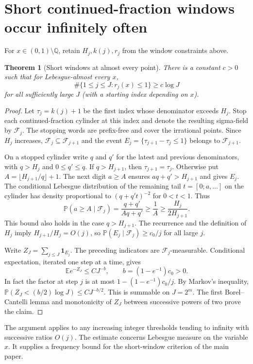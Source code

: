 \documentclass[11pt]{article}
\newtheorem{theorem}{Theorem}
\theoremstyle{definition}
\theoremstyle{remark}
\begin{document}
\section{Short continued-fraction windows occur infinitely often}
For $x\in(0,1)\setminus\mathbb Q$, retain $H_j,k(j),r_j$ from the window
constraints above.
\begin{theorem}[Short windows at almost every point]\label{thm:short-ae}
There is a constant $c>0$ such that for Lebesgue-almost every $x$,
\[
 \#\{1\le j\le J:r_j(x)\le1\}\ge c\log J
\]
for all sufficiently large $J$ (with a starting index depending on $x$).
\end{theorem}
\begin{proof}
Let $\tau_j=k(j)+1$ be the first index whose denominator exceeds $H_j$.
Stop each continued-fraction cylinder at this index and denote the
resulting sigma-field by $\mathcal F_j$. The stopping words are
prefix-free and cover the irrational points. Since $H_j$ increases,
$\mathcal F_j\subseteq\mathcal F_{j+1}$ and the event
$E_j=\{\tau_{j+1}-\tau_j\le1\}$ belongs to $\mathcal F_{j+1}$.

On a stopped cylinder write $q$ and $q'$ for the latest and previous
denominators, with $q>H_j$ and $0\le q'\le q$. If $q>H_{j+1}$, then
$\tau_{j+1}=\tau_j$. Otherwise put $A=\lfloor H_{j+1}/q\rfloor+1$.
The next digit $a\ge A$ ensures $a q+q'>H_{j+1}$ and gives $E_j$.
The conditional Lebesgue distribution of the remaining tail
$t=[0;a,\ldots]$ on the cylinder has density proportional to
$(q+q't)^{-2}$ for $0<t<1$. Thus
\[
 \mathbb P(a\ge A\mid\mathcal F_j)
 =\frac{q+q'}{Aq+q'}\ge\frac1A\ge \frac{H_j}{2H_{j+1}}.
\]
This bound also holds in the case $q>H_{j+1}$. The recurrence and the
definition of $H_j$ imply $H_{j+1}/H_j=O(j)$, so
$\mathbb P(E_j\mid\mathcal F_j)\ge c_0/j$ for all large $j$.

Write $Z_J=\sum_{j\le J}\mathbf 1_{E_j}$. The preceding indicators are
$\mathcal F_j$-measurable. Conditional expectation, iterated one step
at a time, gives
\[
 \mathbb E e^{-Z_J}\le C J^{-b},\qquad
 b=(1-e^{-1})c_0>0.
\]
In fact the factor at step $j$ is at most
$1-(1-e^{-1})c_0/j$. By Markov's inequality,
$\mathbb P(Z_J<(b/2)\log J)\le C J^{-b/2}$.
This is summable on $J=2^m$. The first Borel--Cantelli lemma and
monotonicity of $Z_J$ between successive powers of two prove the claim.
\end{proof}
The argument applies to any increasing integer thresholds tending to
infinity with successive ratios $O(j)$. The estimate concerns
Lebesgue measure on the variable $x$. It supplies a frequency bound
for the short-window criterion of the main paper.
\end{document}
